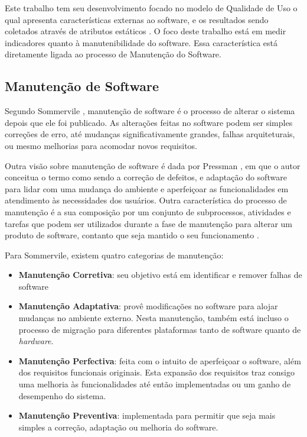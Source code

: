 Este trabalho tem seu desenvolvimento focado no modelo de Qualidade de Uso
o qual apresenta características externas ao software, e os resultados sendo coletados através de atributos estáticos \cite{Square}. O foco deste trabalho está em medir indicadores quanto à manutenibilidade do software. Essa característica está diretamente ligada ao processo de Manutenção do Software.

\subsection{Manutenção de Software}
Segundo Sommervile \cite{sommervile}, manutenção de software é o processo de alterar o sistema depois que ele foi publicado. As alterações feitas no software podem ser simples correções de erro, até mudanças significativamente grandes, falhas arquiteturais, ou mesmo melhorias para acomodar novos requisitos.

Outra visão sobre manutenção de software é dada por Pressman \cite{pressman}, em que o autor conceitua o termo como sendo a correção de defeitos, e adaptação do software para lidar com uma mudança do ambiente e aperfeiçoar as funcionalidades em atendimento às necessidades dos usuários. Outra característica do processo de manutenção é a sua composição por um conjunto de subprocessos, atividades e tarefas que podem ser utilizados durante a fase de manutenção para alterar um produto de software, contanto que seja mantido o seu funcionamento \cite{calazans_avaliacao_2005}.

Para Sommervile, existem quatro categorias de manutenção:
\begin{itemize}
\item \textbf{Manutenção Corretiva}: seu objetivo está em identificar e remover falhas de software
\item \textbf{Manutenção Adaptativa}: provê modificações no software para alojar mudanças no ambiente externo. Nesta manutenção, também está incluso o processo de migração para diferentes plataformas tanto de software quanto de \textit{hardware}.
\item \textbf{Manutenção Perfectiva}: feita com o intuito de aperfeiçoar o software, além dos requisitos funcionais originais. Esta expansão dos requisitos traz consigo uma melhoria às funcionalidades até então implementadas ou um ganho de desempenho do sistema.
\item \textbf{Manutenção Preventiva}: implementada para permitir que seja mais simples a correção, adaptação ou melhoria do software.
\end{itemize}

